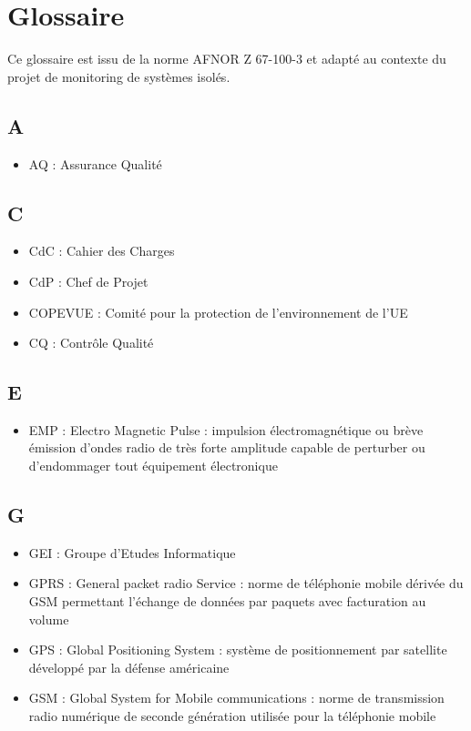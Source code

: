 \documentclass[a4paper]{article}
\begin{document}
\section{Glossaire}

Ce glossaire est issu de la norme AFNOR Z 67-100-3 et adapté au contexte du projet de monitoring de systèmes isolés.

\subsection{A}

\begin{itemize}
\item AQ : Assurance Qualité
\end{itemize}

\subsection{C}

\begin{itemize}
\item CdC : Cahier des Charges
\item CdP : Chef de Projet
\item COPEVUE : Comité pour la protection de l’environnement de l’UE
\item CQ : Contrôle Qualité
\end{itemize}

\subsection{E}

\begin{itemize}
\item EMP : Electro Magnetic Pulse : impulsion électromagnétique ou brève émission d’ondes radio
de très forte amplitude capable de perturber ou d’endommager
tout équipement électronique
\end{itemize}

\subsection{G}

\begin{itemize}
\item GEI : Groupe d’Etudes Informatique
\item GPRS : General packet radio Service : norme de téléphonie mobile dérivée du GSM permettant
l’échange de données par paquets avec facturation au volume
\item GPS : Global Positioning System : système de positionnement par satellite développé par la
défense américaine
\item GSM : Global System for Mobile communications :
norme de transmission radio numérique de seconde génération
utilisée pour la téléphonie mobile
\end{itemize}
\end{document}

